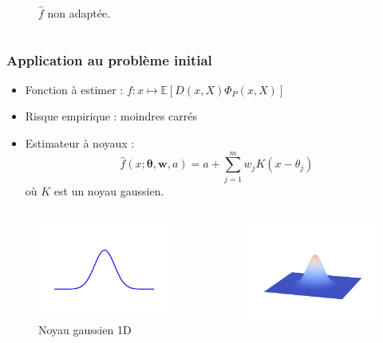 \documentclass[c]{beamer}
\begin{document}
\begin{frame}
\begin{columns}
\begin{column}{.5\textwidth}
\begin{figure}
        \caption{$\hat{f}$ non adapt\'ee.}
      \end{figure}
    \end{column}
  \end{columns}
\end{frame}

\begin{frame}
  \frametitle{Application au problème initial}

  \begin{itemize}
    \item Fonction à estimer : $f : x \mapsto \mathbb{E}\left[ D(x,X) \Phi_P(x,X) \right]$
    \item Risque empirique : moindres carr\'es
    \item Estimateur à noyaux :
      \[
          \hat{f}(x; \mathbf{\theta}, \mathbf{w}, a) = a + \sum_{j=1}^m w_j K(x - \theta_j)
      \]
      où $K$ est un noyau gaussien.
  \end{itemize}
  \begin{columns}
      \begin{column}{.5\textwidth}
          \begin{figure}
              \centering
              \includegraphics[width=.7\textwidth]{gaussian_kernel_1d}
              \caption{Noyau gaussien 1D}
          \end{figure}
      \end{column}
      \begin{column}{.5\textwidth}
          \begin{figure}
              \centering
              \includegraphics[width=.7\textwidth]{gaussian_kernel_2d}

\end{figure}
\end{column}
\end{columns}
\end{frame}
\end{document}
